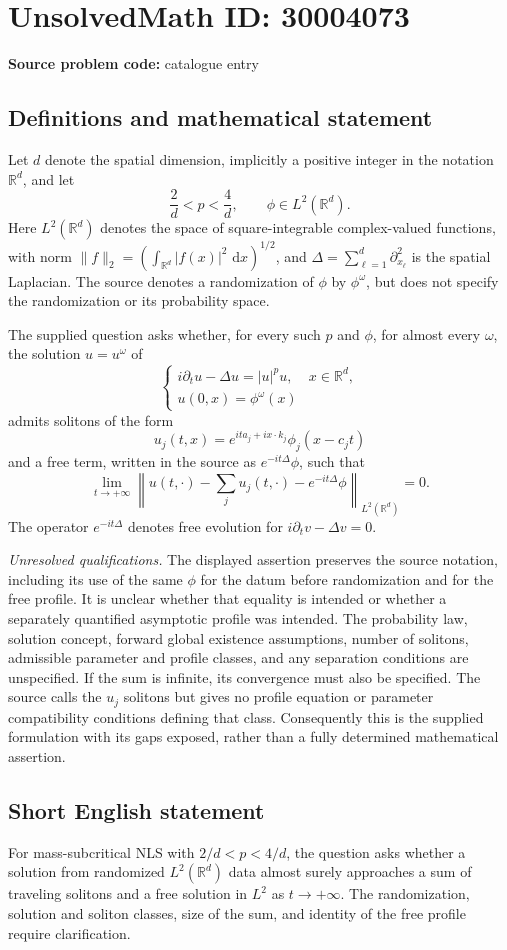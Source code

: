 \documentclass[11pt]{article}
\newcommand{\R}{\mathbb{R}}
\newcommand{\dd}{\,\mathrm{d}}
\begin{document}
\section*{UnsolvedMath ID: 30004073}
\textbf{Source problem code:} catalogue entry
\subsection{Definitions and mathematical statement}
Let \(d\) denote the spatial dimension, implicitly a positive integer in the notation \(\R^d\), and let
\[
\frac{2}{d}<p<\frac{4}{d},\qquad \phi\in L^2(\R^d).
\]
Here \(L^2(\R^d)\) denotes the space of square-integrable complex-valued functions, with norm \(\|f\|_2=(\int_{\R^d}|f(x)|^2\,\dd x)^{1/2}\), and \(\Delta=\sum_{\ell=1}^d\partial_{x_\ell}^2\) is the spatial Laplacian. The source denotes a randomization of \(\phi\) by \(\phi^\omega\), but does not specify the randomization or its probability space.

The supplied question asks whether, for every such \(p\) and \(\phi\), for almost every \(\omega\), the solution \(u=u^\omega\) of
\[
\begin{cases}
i\partial_tu-\Delta u=|u|^pu, & x\in\R^d,\\
u(0,x)=\phi^\omega(x)
\end{cases}
\]
admits solitons of the form
\[
u_j(t,x)=e^{it a_j+i x\cdot k_j}\phi_j(x-c_jt)
\]
and a free term, written in the source as \(e^{-it\Delta}\phi\), such that
\[
\lim_{t\to+\infty}
\left\|u(t,\cdot)-\sum_j u_j(t,\cdot)-e^{-it\Delta}\phi\right\|_{L^2(\R^d)}=0.
\]
The operator \(e^{-it\Delta}\) denotes free evolution for \(i\partial_tv-\Delta v=0\).

\textit{Unresolved qualifications.} The displayed assertion preserves the source notation, including its use of the same \(\phi\) for the datum before randomization and for the free profile. It is unclear whether that equality is intended or whether a separately quantified asymptotic profile was intended. The probability law, solution concept, forward global existence assumptions, number of solitons, admissible parameter and profile classes, and any separation conditions are unspecified. If the sum is infinite, its convergence must also be specified. The source calls the \(u_j\) solitons but gives no profile equation or parameter compatibility conditions defining that class. Consequently this is the supplied formulation with its gaps exposed, rather than a fully determined mathematical assertion.
\subsection{Short English statement}
For mass-subcritical NLS with \(2/d<p<4/d\), the question asks whether a solution from randomized \(L^2(\R^d)\) data almost surely approaches a sum of traveling solitons and a free solution in \(L^2\) as \(t\to+\infty\). The randomization, solution and soliton classes, size of the sum, and identity of the free profile require clarification.
\end{document}
